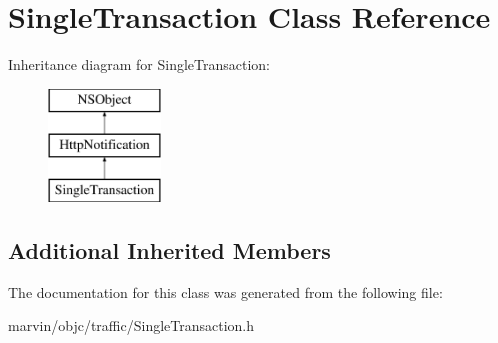 \hypertarget{interface_single_transaction}{}\section{Single\+Transaction Class Reference}
\label{interface_single_transaction}
Inheritance diagram for Single\+Transaction\+:\begin{figure}[H]
\begin{center}
\leavevmode
\includegraphics[height=3.000000cm]{interface_single_transaction}
\end{center}
\end{figure}
\subsection*{Additional Inherited Members}


The documentation for this class was generated from the following file\+:\begin{DoxyCompactItemize}
\item 
marvin/objc/traffic/Single\+Transaction.\+h\end{DoxyCompactItemize}
